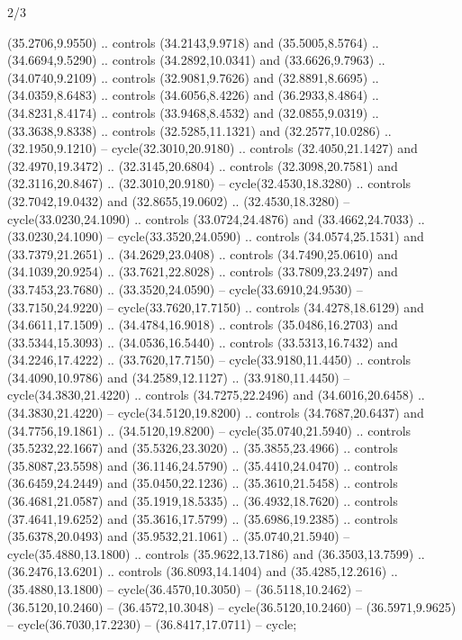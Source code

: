 \begin{flagdescription}{2/3}
\begin{scope}[yshift=\flagwidth,scale=\flagwidth/1241.93737]
\begin{scope}[y=-1mm, x=1mm,draw=gold,fill=blue,line join=miter,miter limit=4,line width=1.8\lw]
\begin{scope}[y=1mm, x=1mm, yscale=-1,shift={(573.68mm+\str,145.75)}]
\begin{scope}[scale=1.35,shift={(-9,-3)}]
\begin{scope}[scale=0.55]
\begin{scope}[scale=1.333]
    (35.2706,9.9550) .. controls (34.2143,9.9718) and (35.5005,8.5764) ..
    (34.6694,9.5290) .. controls (34.2892,10.0341) and (33.6626,9.7963) ..
    (34.0740,9.2109) .. controls (32.9081,9.7626) and (32.8891,8.6695) ..
    (34.0359,8.6483) .. controls (34.6056,8.4226) and (36.2933,8.4864) ..
    (34.8231,8.4174) .. controls (33.9468,8.4532) and (32.0855,9.0319) ..
    (33.3638,9.8338) .. controls (32.5285,11.1321) and (32.2577,10.0286) ..
    (32.1950,9.1210) -- cycle(32.3010,20.9180) .. controls (32.4050,21.1427) and
    (32.4970,19.3472) .. (32.3145,20.6804) .. controls (32.3098,20.7581) and
    (32.3116,20.8467) .. (32.3010,20.9180) -- cycle(32.4530,18.3280) .. controls
    (32.7042,19.0432) and (32.8655,19.0602) .. (32.4530,18.3280) --
    cycle(33.0230,24.1090) .. controls (33.0724,24.4876) and (33.4662,24.7033) ..
    (33.0230,24.1090) -- cycle(33.3520,24.0590) .. controls (34.0574,25.1531) and
    (33.7379,21.2651) .. (34.2629,23.0408) .. controls (34.7490,25.0610) and
    (34.1039,20.9254) .. (33.7621,22.8028) .. controls (33.7809,23.2497) and
    (33.7453,23.7680) .. (33.3520,24.0590) -- cycle(33.6910,24.9530) --
    (33.7150,24.9220) -- cycle(33.7620,17.7150) .. controls (34.4278,18.6129) and
    (34.6611,17.1509) .. (34.4784,16.9018) .. controls (35.0486,16.2703) and
    (33.5344,15.3093) .. (34.0536,16.5440) .. controls (33.5313,16.7432) and
    (34.2246,17.4222) .. (33.7620,17.7150) -- cycle(33.9180,11.4450) .. controls
    (34.4090,10.9786) and (34.2589,12.1127) .. (33.9180,11.4450) --
    cycle(34.3830,21.4220) .. controls (34.7275,22.2496) and (34.6016,20.6458) ..
    (34.3830,21.4220) -- cycle(34.5120,19.8200) .. controls (34.7687,20.6437) and
    (34.7756,19.1861) .. (34.5120,19.8200) -- cycle(35.0740,21.5940) .. controls
    (35.5232,22.1667) and (35.5326,23.3020) .. (35.3855,23.4966) .. controls
    (35.8087,23.5598) and (36.1146,24.5790) .. (35.4410,24.0470) .. controls
    (36.6459,24.2449) and (35.0450,22.1236) .. (35.3610,21.5458) .. controls
    (36.4681,21.0587) and (35.1919,18.5335) .. (36.4932,18.7620) .. controls
    (37.4641,19.6252) and (35.3616,17.5799) .. (35.6986,19.2385) .. controls
    (35.6378,20.0493) and (35.9532,21.1061) .. (35.0740,21.5940) --
    cycle(35.4880,13.1800) .. controls (35.9622,13.7186) and (36.3503,13.7599) ..
    (36.2476,13.6201) .. controls (36.8093,14.1404) and (35.4285,12.2616) ..
    (35.4880,13.1800) -- cycle(36.4570,10.3050) -- (36.5118,10.2462) --
    (36.5120,10.2460) -- (36.4572,10.3048) -- cycle(36.5120,10.2460) --
    (36.5971,9.9625) -- cycle(36.7030,17.2230) -- (36.8417,17.0711) -- cycle;

\end{scope}
\end{scope}
\end{scope}
\end{scope}
\end{scope}
\end{scope}
\end{flagdescription}
